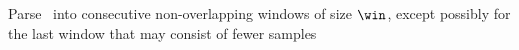 

\beginAlgorithm
{}
Parse \column\ into consecutive non-overlapping windows of size $\win$, except possibly for the last window that may consist of fewer samples\\

